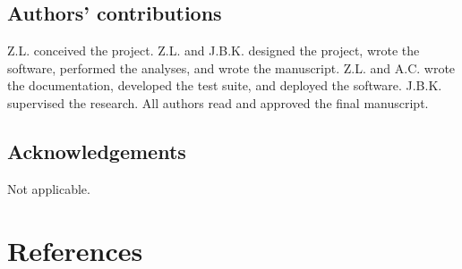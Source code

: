 \documentclass[twoside]{kinneylab_preprintstyle}
\begin{document}
\subsection*{Authors' contributions}
Z.L. conceived the project. Z.L. and J.B.K. designed the project, wrote the software, performed the analyses, and wrote the manuscript. Z.L. and A.C. wrote the documentation, developed the test suite, and deployed the software. J.B.K. supervised the research. All authors read and approved the final manuscript.

\subsection*{Acknowledgements}
Not applicable.

\section*{References}


\end{document}
